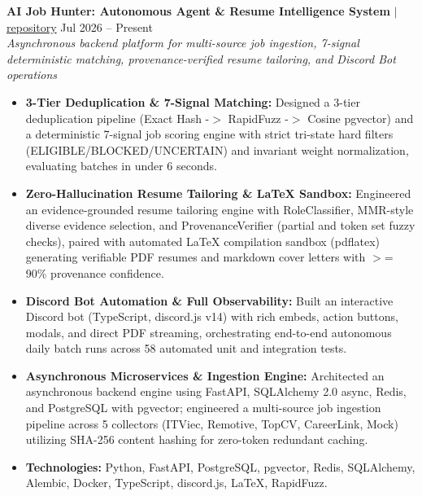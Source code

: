 \documentclass[10pt,a4paper]{article}
\begin{document}
\noindent \textbf{AI Job Hunter: Autonomous Agent \& Resume Intelligence System} $|$ \href{https://github.com/vyquochuy/Discord-Job-hunt}{repository} \hfill Jul 2026 -- Present\\
\textit{Asynchronous backend platform for multi-source job ingestion, 7-signal deterministic matching, provenance-verified resume tailoring, and Discord Bot operations}
\begin{itemize}[leftmargin=0.25in, nosep]
    \item \textbf{3-Tier Deduplication \& 7-Signal Matching:} Designed a 3-tier deduplication pipeline (Exact Hash -$>$ RapidFuzz -$>$ Cosine pgvector) and a deterministic 7-signal job scoring engine with strict tri-state hard filters (ELIGIBLE/BLOCKED/UNCERTAIN) and invariant weight normalization, evaluating batches in under 6 seconds.
    \item \textbf{Zero-Hallucination Resume Tailoring \& LaTeX Sandbox:} Engineered an evidence-grounded resume tailoring engine with RoleClassifier, MMR-style diverse evidence selection, and ProvenanceVerifier (partial and token set fuzzy checks), paired with automated LaTeX compilation sandbox (pdflatex) generating verifiable PDF resumes and markdown cover letters with $>$= 90\% provenance confidence.
    \item \textbf{Discord Bot Automation \& Full Observability:} Built an interactive Discord bot (TypeScript, discord.js v14) with rich embeds, action buttons, modals, and direct PDF streaming, orchestrating end-to-end autonomous daily batch runs across 58 automated unit and integration tests.
    \item \textbf{Asynchronous Microservices \& Ingestion Engine:} Architected an asynchronous backend engine using FastAPI, SQLAlchemy 2.0 async, Redis, and PostgreSQL with pgvector; engineered a multi-source job ingestion pipeline across 5 collectors (ITViec, Remotive, TopCV, CareerLink, Mock) utilizing SHA-256 content hashing for zero-token redundant caching.
    \item \textbf{Technologies:} Python, FastAPI, PostgreSQL, pgvector, Redis, SQLAlchemy, Alembic, Docker, TypeScript, discord.js, LaTeX, RapidFuzz.
\end{itemize}
\vspace{10pt}
\end{document}
